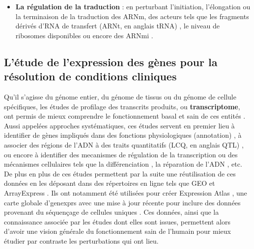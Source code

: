 \begin{itemize}
    \item \textbf{La régulation de la traduction} : en perturbant l'initiation, l'élongation ou la terminaison de la traduction des ARNm, des acteurs tels que les fragments dérivés d'\acrshort{RNA} de transfert (\acrshort{ARNt}, en anglais tRNA) \cite{Krishna2021Mar}, le niveau de ribosomes disponibles \cite{Khajuria2018Mar} ou encore des \acrshort{ARNmi} \cite{Meijer2013Apr}.
\end{itemize}




\subsection{L'étude de l'expression des gènes pour la résolution de conditions cliniques}

Qu'il s'agisse du génome entier, du génome de tissus ou du génome de cellule spécifiques, les études de profilage des transcrits produits, ou \textbf{\gls{transcriptome}}, ont permis de mieux comprendre le fonctionnement basal et sain de ces entités \cite{Hughes2000, Cloonan2008Jul}. Aussi appelées approches systématiques, ces études servent en premier lieu à identifier de gènes impliqués dans des fonctions physiologiques (annotation) \cite{Munji2019Nov}, à associer des régions de l'\acrshort{ADN} à des traits quantitatifs (\acrfull{LCQ}, en anglais \acrfull{QTL}) \cite{Sarkar2019Apr}, ou encore à identifier des \glspl{mecanisme} de régulation de la transcription \cite{Segales2016Dec} ou des mécanismes cellulaires tels que la différenciation \cite{Godoy2018Jul}, la réparation de l'\acrshort{ADN} \cite{Jividen2018Dec}, etc. De plus en plus de ces études permettent par la suite une réutilisation de ces données en les déposant dans des répertoires en ligne tels que \acrfull{GEO} \cite{Barrett2013Jan} et ArrayExpress \cite{Athar2019Jan}. Ils ont notamment été utilisées pour créer Expression Atlas \cite{Lukk2010Apr}, une carte globale d'\glspl{genexpr} avec une mise à jour récente pour inclure des données provenant du séquençage de cellules uniques \cite{Papatheodorou2020Jan}. Ces données, ainsi que la connaissance associée par les études dont elles sont issues, permettent alors d'avoir une vision générale du fonctionnement sain de l'humain pour mieux étudier par contraste les perturbations qui ont lieu.

